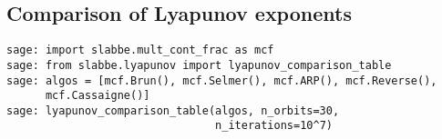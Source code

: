 \subsection{Comparison of Lyapunov exponents}
\begin{verbatim}
sage: import slabbe.mult_cont_frac as mcf
sage: from slabbe.lyapunov import lyapunov_comparison_table
sage: algos = [mcf.Brun(), mcf.Selmer(), mcf.ARP(), mcf.Reverse(),
      mcf.Cassaigne()]
sage: lyapunov_comparison_table(algos, n_orbits=30, 
                                n_iterations=10^7)
\end{verbatim}
